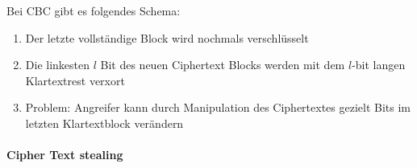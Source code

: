 Bei CBC gibt es folgendes Schema:

\begin{enumerate}
    \item Der letzte vollständige Block wird nochmals verschlüsselt
    \item Die linkesten $l$ Bit des neuen Ciphertext Blocks werden mit dem $l$-bit langen Klartextrest verxort
    \item Problem: Angreifer kann durch Manipulation des Ciphertextes gezielt Bits im letzten Klartextblock verändern
\end{enumerate}

\paragraph{Cipher Text stealing}

